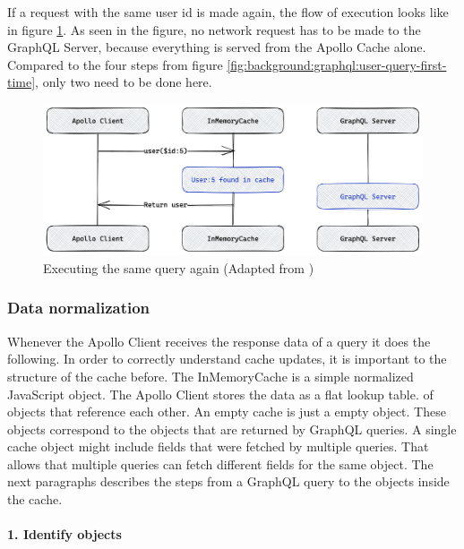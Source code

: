 \noindent If a request with the same user id is made again, the flow of execution looks like in figure \ref{fig:background:graphql:user-query-second-time}. As seen in the figure, no network request has to be made to the GraphQL Server, because everything is served from the Apollo Cache alone. Compared to the four steps from figure \ref{fig:background:graphql:user-query-first-time}, only two need to be done here. \cite{misc:-:background:graphql:apollo-client-cache-overview}

\ifshowImages
\begin{figure}[H]
    \centering
    \includegraphics[width=0.7\linewidth]{images/background/apollo/apollo-client-basic-cache-warm.png}
    \caption{Executing the same query again (Adapted from \cite{misc:-:background:graphql:apollo-client-cache-overview})}\label{fig:background:graphql:user-query-second-time}
\end{figure}
\fi

\subsubsection{Data normalization}\label{subsubsection:background:graphql:apollo-server-client:data-normalization}

Whenever the Apollo Client receives the response data of a query it does the following. In order to correctly understand cache updates, it is important to the structure of the cache before. The InMemoryCache is a simple normalized JavaScript object. The Apollo Client stores the data as a flat lookup table. of objects that reference each other. An empty cache is just a empty object. These objects correspond to the objects that are returned by GraphQL queries. A single cache object might include fields that were fetched by multiple queries. That allows that multiple queries can fetch different fields for the same object. \cite{misc:-:background:graphql:apollo-client-cache-overview} The next paragraphs describes the steps from a GraphQL query to the objects inside the cache.

\paragraph{1. Identify objects}\label{paragraph:background:graphql:apollo-server-client:data-normalization:identify-objects}


